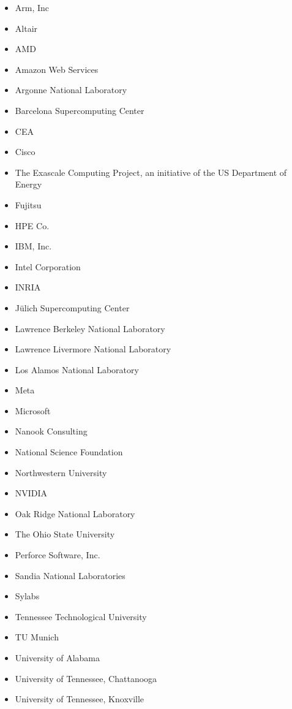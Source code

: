 \begin{itemize}
    \item Arm, Inc
    \item Altair
    \item AMD
    \item Amazon Web Services
    \item Argonne National Laboratory
    \item Barcelona Supercomputing Center
    \item CEA
    \item Cisco
    \item The Exascale Computing Project, an initiative of the US Department of Energy
    \item Fujitsu
    \item HPE Co.
    \item IBM, Inc.
    \item Intel Corporation
    \item INRIA
    \item Jülich Supercomputing Center
    \item Lawrence Berkeley National Laboratory
    \item Lawrence Livermore National Laboratory
    \item Los Alamos National Laboratory
    \item Meta
    \item Microsoft
    \item Nanook Consulting
    \item National Science Foundation
    \item Northwestern University
    \item NVIDIA
    \item Oak Ridge National Laboratory
    \item The Ohio State University
    \item Perforce Software, Inc.
    \item Sandia National Laboratories
    \item Sylabs
    \item Tennessee Technological University
    \item TU Munich
    \item University of Alabama
    \item University of Tennessee, Chattanooga
    \item University of Tennessee, Knoxville
\end{itemize}

